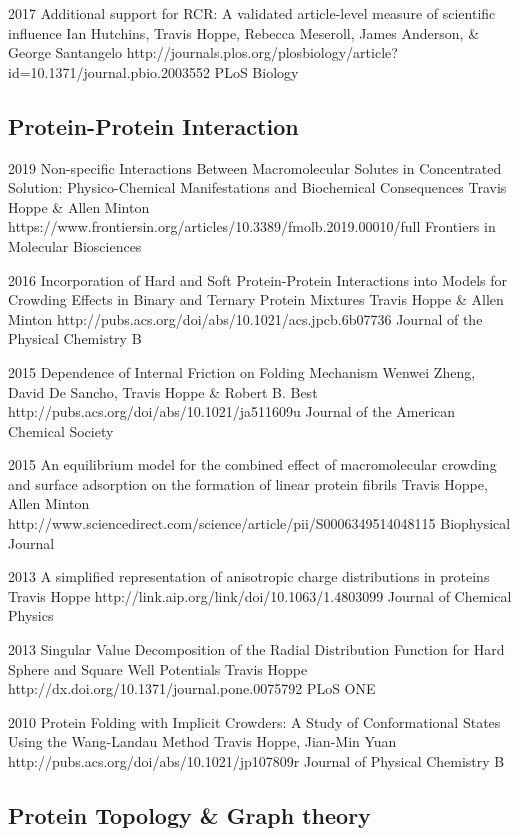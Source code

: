 \documentclass[]{scrartcl}
\begin{document}
\begin{cleanCV}
\Paper
{2017}
{Additional support for RCR: A validated article-level measure of scientific influence}
{Ian Hutchins, Travis Hoppe, Rebecca Meseroll, James Anderson, \& George Santangelo}
{http://journals.plos.org/plosbiology/article?id=10.1371/journal.pbio.2003552}
{PLoS Biology}


\subsection{Protein-Protein Interaction}

\Paper
{2019}
{Non-specific Interactions Between Macromolecular Solutes in Concentrated Solution: Physico-Chemical Manifestations and Biochemical Consequences}
{Travis Hoppe \& Allen Minton}
{https://www.frontiersin.org/articles/10.3389/fmolb.2019.00010/full}
{Frontiers in Molecular Biosciences}


\Paper
{2016}
{Incorporation of Hard and Soft Protein-Protein Interactions into Models for Crowding Effects in Binary and Ternary Protein Mixtures}
{Travis Hoppe \& Allen Minton}
{http://pubs.acs.org/doi/abs/10.1021/acs.jpcb.6b07736}
{Journal of the Physical Chemistry B}

\Paper
{2015}
{Dependence of Internal Friction on Folding Mechanism}
{Wenwei Zheng, David De Sancho, Travis Hoppe \& Robert B. Best}
{http://pubs.acs.org/doi/abs/10.1021/ja511609u}
{Journal of the American Chemical Society}

\Paper
{2015}
{An equilibrium model for the combined effect of macromolecular crowding and surface adsorption on the formation of linear protein fibrils}
{Travis Hoppe, Allen Minton}
{http://www.sciencedirect.com/science/article/pii/S0006349514048115}
{Biophysical Journal}

\Paper
{2013}
{A simplified representation of anisotropic charge distributions in proteins}
{Travis Hoppe}
{http://link.aip.org/link/doi/10.1063/1.4803099}
{Journal of Chemical Physics}

\Paper
{2013}
{Singular Value Decomposition of the Radial Distribution Function 
for Hard Sphere and Square Well Potentials}
{Travis Hoppe}
{http://dx.doi.org/10.1371/journal.pone.0075792}
{PLoS ONE}

\Paper
{2010}
{Protein Folding with Implicit Crowders: 
  A Study of Conformational States Using the Wang-Landau Method}
{Travis Hoppe, Jian-Min Yuan}
{http://pubs.acs.org/doi/abs/10.1021/jp107809r}
{Journal of Physical Chemistry B}


\subsection{Protein Topology \& Graph theory}


\end{cleanCV}
\end{document}
